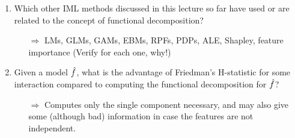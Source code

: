 \begin{enumerate}
    \item 
    Which other IML methods discussed in this lecture so far have used or are related to the concept of functional decomposition?
    \begin{itemize}
        \item[$\Rightarrow$] LMs, GLMs, GAMs, EBMs, RPFs, PDPs, ALE, Shapley, feature importance (Verify for each one, why!)
    \end{itemize}
    \item 
    Given a model $\hat{f}$, what is the advantage of Friedman's H-statistic for some interaction compared to computing the functional decomposition for $\hat{f}$?
    \begin{itemize}
        \item[$\Rightarrow$] Computes only the single component necessary, and may also give some (although bad) information in case the features are not independent.
    \end{itemize}


\end{enumerate}
